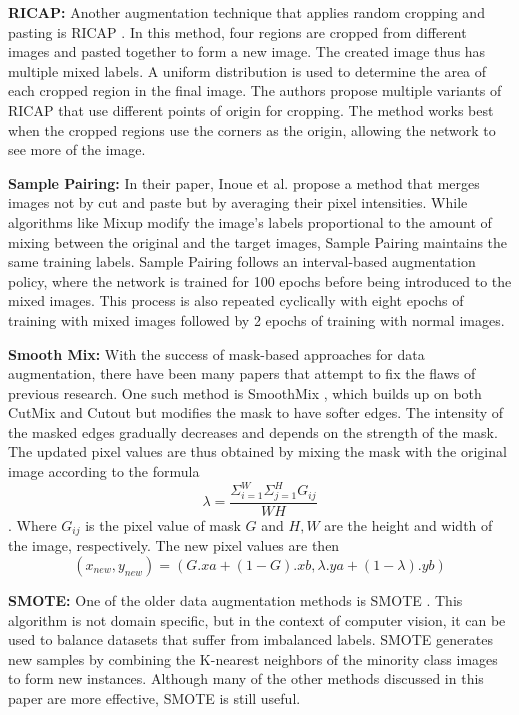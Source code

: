 \documentclass[a4paper,11pt,openright]{book}
\begin{document}
\textbf{RICAP: }
Another augmentation technique that applies random cropping and pasting is RICAP \cite{takahashiDataAugmentationUsing2020}. In this method, four regions are cropped from different images and pasted together to form a new image. The created image thus has multiple mixed labels. A uniform distribution is used to determine the area of each cropped region in the final image. The authors propose multiple variants of RICAP that use different points of origin for cropping. The method works best when the cropped regions use the corners as the origin, allowing the network to see more of the image.

\textbf{Sample Pairing: }
In their paper, Inoue et al. propose a method that merges images not by cut and paste but by averaging their pixel intensities. While algorithms like Mixup \cite{zhangMixupEmpiricalRisk2018} modify the image's labels proportional to the amount of mixing between the original and the target images, Sample Pairing \cite{inoueDataAugmentationPairing2018} maintains the same training labels. Sample Pairing follows an interval-based augmentation policy, where the network is trained for 100 epochs before being introduced to the mixed images. This process is also repeated cyclically with eight epochs of training with mixed images followed by 2 epochs of training with normal images.

\textbf{Smooth Mix: }
With the success of mask-based approaches for data augmentation, there have been many papers that attempt to fix the flaws of previous research. One such method is SmoothMix \cite{leeSmoothMixSimpleEffective2020}, which builds up on both CutMix \cite{yunCutMixRegularizationStrategy2019} and Cutout \cite{devriesImprovedRegularizationConvolutional2017} but modifies the mask to have softer edges. The intensity of the masked edges gradually decreases and depends on the strength of the mask. The updated pixel values are thus obtained by mixing the mask with the original image according to the formula $$\lambda= \frac{\Sigma_{i=1}^{W}\Sigma_{j=1}^{H}G_{ij}}{WH}$$. Where $G_{ij}$ is the pixel value of mask $G$ and $H, W$ are the height and width of the image, respectively. The new pixel values are then $$(x_{new} , y_{new}) = (G.xa + (1 - G).xb , \lambda.ya + (1 - \lambda).yb)$$

\textbf{SMOTE: }
One of the older data augmentation methods is SMOTE \cite{SMOTESyntheticMinority}. This algorithm is not domain specific, but in the context of computer vision, it can be used to balance datasets that suffer from imbalanced labels. SMOTE generates new samples by combining the K-nearest neighbors of the minority class images to form new instances. Although many of the other methods discussed in this paper are more effective, SMOTE is still useful.
\end{document}

